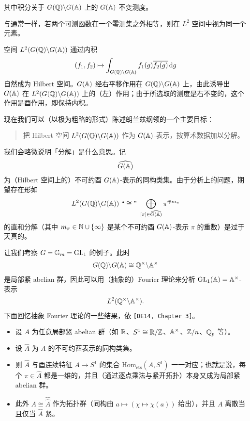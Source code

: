 其中积分关于 $G(\mathbb{Q})\backslash G(\mathbb{A})$ 上的 $G(\mathbb{A})$-不变测度。

与通常一样，若两个可测函数在一个零测集之外相等，则在 $L^2$ 空间中视为同一个元素。

空间 $L^2(G(\mathbb{Q})\backslash G(\mathbb{A}))$ 通过内积
\[
(f_1,f_2)\mapsto\int_{G(\mathbb{Q})\backslash G(\mathbb{A})}f_1(g)\overline{f_2(g)}\,\mathrm{d}g
\]
自然成为 Hilbert 空间。$G(\mathbb{A})$ 经右平移作用在 $G(\mathbb{Q})\backslash G(\mathbb{A})$ 上，由此诱导出 $G(\mathbb{A})$ 在 $L^2(G(\mathbb{Q})\backslash G(\mathbb{A}))$ 上的（左）作用；由于所选取的测度是右不变的，这个作用是酉作用，即保持内积。

现在我们可以（以极为粗略的形式）陈述朗兰兹纲领的一个主要目标：

\begin{quote}
把 Hilbert 空间 $L^2(G(\mathbb{Q})\backslash G(\mathbb{A}))$ 作为 $G(\mathbb{A})$-表示，按算术数据加以分解。
\end{quote}

我们会略微说明「分解」是什么意思。记
\[
\widehat{G(\mathbb{A})}
\]
为（Hilbert 空间上的）不可约酉 $G(\mathbb{A})$-表示的同构类集。由于分析上的问题，期望存在形如
\[
L^2(G(\Q)\backslash G(\A))\ \text{“}\cong\text{”}\ \bigoplus_{[\pi]\in\widehat{G(\A)}}\pi^{\oplus m_\pi}
\]
的直和分解（其中 $m_\pi\in\mathbb{N}\cup\{\infty\}$ 是某个不可约酉 $G(\mathbb{A})$-表示 $\pi$ 的重数）是过于天真的。

让我们考察 $G=\mathbb{G}_m=\operatorname{GL}_1$ 的例子。此时
\[
G(\mathbb{Q})\backslash G(\mathbb{A})\cong\mathbb{Q}^\times\backslash\mathbb{A}^\times
\]
是局部紧 abelian 群，因此可以用（抽象的）Fourier 理论来分析 $\operatorname{GL}_1(\mathbb{A})=\mathbb{A}^\times$-表示
\[
L^2(\mathbb{Q}^\times\backslash\mathbb{A}^\times).
\]
下面回忆抽象 Fourier 理论的一些结果，依 \texttt{[DE14, Chapter 3]}。

\begin{itemize}
\item 设 $A$ 为任意局部紧 abelian 群（如 $\mathbb{R}$、$S^1\cong\mathbb{R}/\mathbb{Z}$、$\mathbb{A}^\times$、$\mathbb{Z}/n$、$\mathbb{Q}_p$ 等）。
\item 设 $\widehat A$ 为 $A$ 的不可约酉表示的同构类集。
\item 则 $\widehat A$ 与酉连续特征 $A\to S^1$ 的集合 $\mathrm{Hom}_{\mathrm{cts}}(A,S^1)$ 一一对应；也就是说，每个 $\pi\in\widehat A$ 都是一维的，并且（通过逐点乘法与紧开拓扑）本身又成为局部紧 abelian 群。
\item 此外 $A\cong\widehat{\widehat A}$ 作为拓扑群（同构由 $a\mapsto(\chi\mapsto\chi(a))$ 给出），并且 $A$ 离散当且仅当 $\widehat A$ 紧。
\end{itemize}

